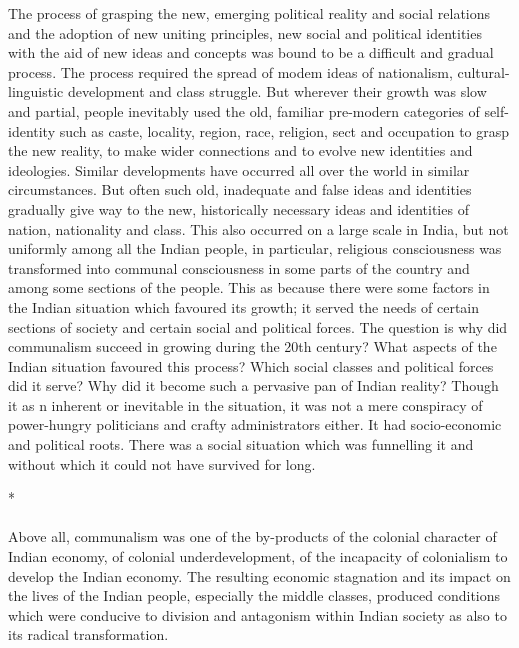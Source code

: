 The process of grasping the new, emerging political reality and social relations and the adoption of new uniting principles, new social and political identities with the aid of new ideas and concepts was bound to be a difficult and gradual process. The process required the spread of modem ideas of nationalism, cultural-linguistic development and class struggle. But wherever their growth was slow and partial, people inevitably used the old, familiar pre-modern categories of self-identity such as caste, locality, region, race, religion, sect and occupation to grasp the new reality, to make wider connections and to evolve new identities and ideologies. Similar developments have occurred all over the world in similar circumstances. But often such old, inadequate and false ideas and identities gradually give way to the new, historically necessary ideas and identities of nation, nationality and class. This also occurred on a large scale in India, but not uniformly among all the Indian people, in particular, religious consciousness was transformed into communal consciousness in some parts of the country and among some sections of the people. This as because there were some factors in the Indian situation which favoured its growth; it served the needs of certain sections of society and certain social and political forces. The question is why did communalism succeed in growing during the 20th century? What aspects of the Indian situation favoured this process? Which social classes and political forces did it serve? Why did it become such a pervasive pan of Indian reality? Though it as n inherent or inevitable in the situation, it was not a mere conspiracy of power-hungry politicians and crafty administrators either. It had socio-economic and political roots. There was a social situation which was funnelling it and without which it could not have survived for long.

\begin{center}*\end{center}

\paragraph*{}


Above all, communalism was one of the by-products of the colonial character of Indian economy, of colonial underdevelopment, of the incapacity of colonialism to develop the Indian economy. The resulting economic stagnation and its impact on the lives of the Indian people, especially the middle classes, produced conditions which were conducive to division and antagonism within Indian society as also to its radical transformation. 

